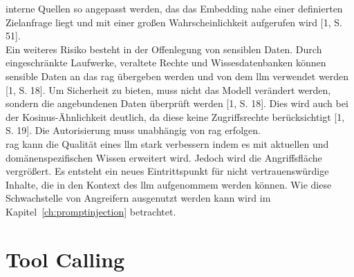 interne Quellen so angepasst werden, das das Embedding nahe einer definierten Zielanfrage liegt und mit einer großen Wahrscheinlichkeit aufgerufen wird [1, S. 51]. \\
Ein weiteres Risiko besteht in der Offenlegung von sensiblen Daten. Durch eingeschränkte Laufwerke, veraltete Rechte und Wissesdatenbanken können sensible Daten
an das \ac{rag} übergeben werden und von dem \ac{llm} verwendet werden [1, S. 18]. Um Sicherheit zu bieten, muss nicht das Modell verändert werden, sondern die 
angebundenen Daten überprüft werden [1, S. 18]. Dies wird auch bei der Kosinus-Ähnlichkeit deutlich, da diese keine Zugriffsrechte berücksichtigt [1, S. 19]. Die
Autorisierung muss unabhängig von \ac{rag} erfolgen. \\
\ac{rag} kann die Qualität eines \ac{llm} stark verbessern indem es mit aktuellen und domänenspezifischen Wissen erweitert wird. Jedoch wird die Angriffsfläche 
vergrößert. Es entsteht ein neues Eintrittspunkt für nicht vertrauenswürdige Inhalte, die in den Kontext des \ac{llm} aufgenommem werden können. Wie diese Schwachstelle
von Angreifern ausgenutzt werden kann wird im Kapitel~\ref{ch:promptinjection} betrachtet. 

\section{Tool Calling}

